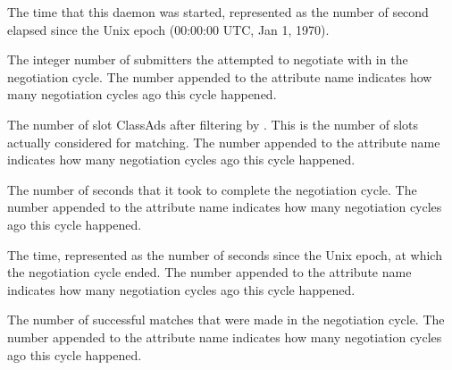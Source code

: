 \begin{description}

\item[\AdAttr{DaemonStartTime}:] The time that this daemon was
started, represented as the number of second elapsed since
the Unix epoch (00:00:00 UTC, Jan 1, 1970).

\label{attr:LastNegotiationCycleActiveSubmitterCount<X>}
\item[\AdAttr{LastNegotiationCycleActiveSubmitterCount<X>}:] 
The integer number of submitters
the  attempted to negotiate with in the negotiation cycle.
The number  appended to the attribute name indicates how
many negotiation cycles ago this cycle happened.

\label{attr:LastNegotiationCycleCandidateSlots<X>}
\item[\AdAttr{LastNegotiationCycleCandidateSlots<X>}:] 
The number of slot ClassAds after filtering by 
.
This is the number of slots actually considered for matching.
The number  appended to the attribute name indicates how many 
negotiation cycles ago this cycle happened.

\label{attr:LastNegotiationCycleDuration<X>}
\item[\AdAttr{LastNegotiationCycleDuration<X>}:] The number of seconds
that it took to complete the negotiation cycle.  The number 
appended to the attribute name indicates how many negotiation cycles
ago this cycle happened.

\label{attr:LastNegotiationCycleEnd<X>}
\item[\AdAttr{LastNegotiationCycleEnd<X>}:] 
The time, represented as the number of seconds since the Unix epoch,
at which the negotiation cycle ended. 
The number  appended to the attribute name 
indicates how many negotiation cycles ago this cycle happened.

\label{attr:LastNegotiationCycleMatches<X>}
\item[\AdAttr{LastNegotiationCycleMatches<X>}:] The number of successful
matches that were made in the negotiation cycle.
The number  appended to the attribute name 
indicates how many negotiation cycles ago this cycle happened.


\end{description}

